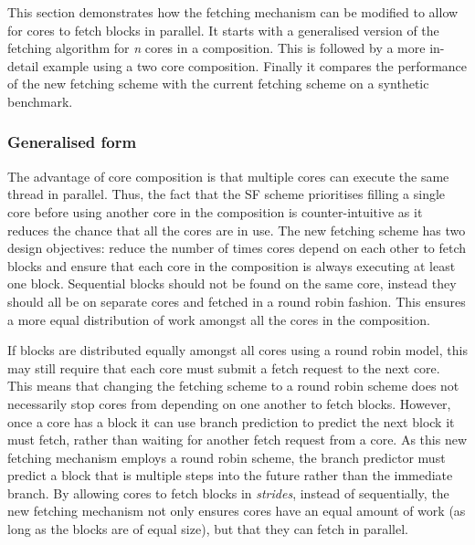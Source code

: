 This section demonstrates how the fetching mechanism can be modified to allow for cores to fetch blocks in parallel.
It starts with a generalised version of the fetching algorithm for \textit{n} cores in a composition.
This is followed by a more in-detail example using a two core composition.
Finally it compares the performance of the new fetching scheme with the current fetching scheme on a synthetic benchmark.

\subsubsection{Generalised form}
The advantage of core composition is that multiple cores can execute the same thread in parallel.
Thus, the fact that the SF scheme prioritises filling a single core before using another core in the composition is counter-intuitive as it reduces the chance that all the cores are in use.
The new fetching scheme has two design objectives: reduce the number of times cores depend on each other to fetch blocks and ensure that each core in the composition is always executing at least one block.
Sequential blocks should not be found on the same core, instead they should all be on separate cores and fetched in a round robin fashion.
This ensures a more equal distribution of work amongst all the cores in the composition.

If blocks are distributed equally amongst all cores using a round robin model, this may still require that each core must submit a fetch request to the next core.
This means that changing the fetching scheme to a round robin scheme does not necessarily stop cores from depending on one another to fetch blocks.
However, once a core has a block it can use branch prediction to predict the next block it must fetch, rather than waiting for another fetch request from a core.
As this new fetching mechanism employs a round robin scheme, the branch predictor must predict a block that is multiple steps into the future rather than the immediate branch.
By allowing cores to fetch blocks in \textit{strides}, instead of sequentially, the new fetching mechanism not only ensures cores have an equal amount of work (as long as the blocks are of equal size), but that they can fetch in parallel.

